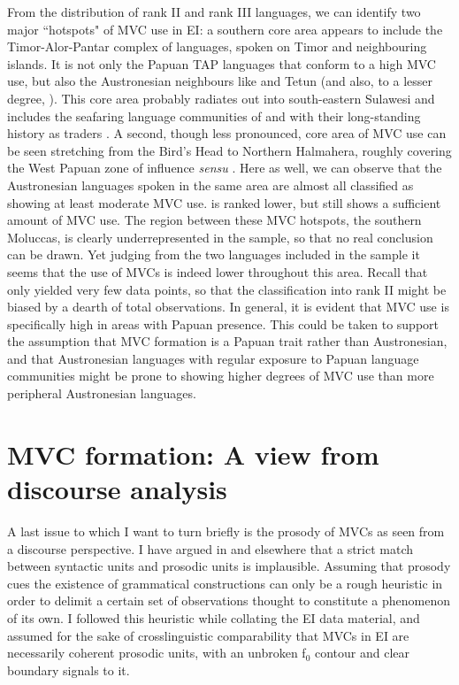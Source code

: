 From the distribution of rank II and rank III languages, we can identify two major ``hotspots" of MVC use in EI: a southern core area appears to include the Timor-Alor-Pantar complex of languages, spoken on Timor and neighbouring islands. It is not only the Papuan TAP languages that conform to a high MVC use, but also the Austronesian neighbours like  and Tetun (and also, to a lesser degree, ). This core area probably radiates out into south-eastern Sulawesi and includes the seafaring language communities of  and  with their long-standing history as traders \citep{donohue1999}. A second, though less pronounced, core area of MVC use can be seen stretching from the Bird's Head to Northern Halmahera, roughly covering the West Papuan zone of influence \textit{sensu} \citet{reesink2005west}. Here as well, we can observe that the Austronesian languages spoken in the same area are almost all classified as showing at least moderate MVC use.  is ranked lower, but still shows a sufficient amount of MVC use. The region between these MVC hotspots, the southern Moluccas, is clearly underrepresented in the sample, so that no real conclusion can be drawn. Yet judging from the two languages included in the sample it seems that the use of MVCs is indeed lower throughout this area. Recall that  only yielded very few data points, so that the classification into rank II might be biased by a dearth of total observations. In general, it is evident that MVC use is specifically high in areas with Papuan presence. This could be taken to support the assumption that MVC formation is a Papuan trait rather than Austronesian, and that Austronesian languages with regular exposure to Papuan language communities might be prone to showing higher degrees of MVC use than more peripheral Austronesian languages.

\section{MVC formation: A view from discourse analysis} \label{sec:discourse}

A last issue to which I want to turn briefly is the prosody of MVCs as seen from a discourse perspective. I have argued in  and elsewhere that a strict match between syntactic units and prosodic units is implausible. Assuming that prosody cues the existence of grammatical constructions can only be a rough heuristic in order to delimit a certain set of observations thought to constitute a phenomenon of its own. I followed this heuristic while collating the EI data material, and assumed for the sake of crosslinguistic comparability that MVCs in EI are necessarily coherent prosodic units, with an unbroken f$_0$ contour and clear boundary signals to it.

